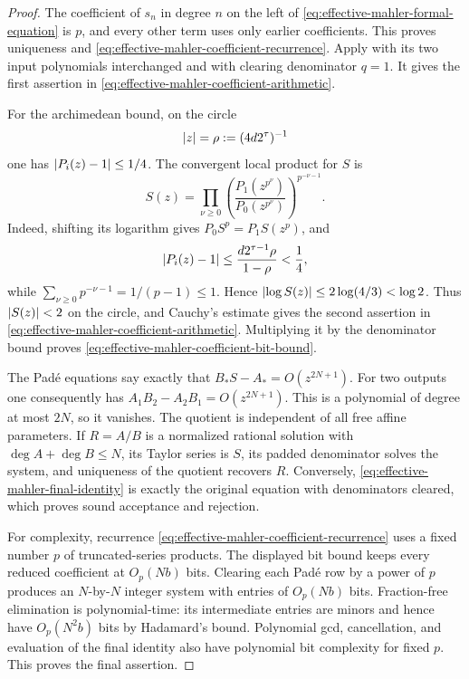 \begin{proof}
The coefficient of \(s_n\) in degree \(n\) on the left of
\eqref{eq:effective-mahler-formal-equation} is \(p\), and every other term
uses only earlier coefficients.  This proves uniqueness and
\eqref{eq:effective-mahler-coefficient-recurrence}.  Apply
 with its two input
polynomials interchanged and with clearing denominator \(q=1\).  It gives
the first assertion in \eqref{eq:effective-mahler-coefficient-arithmetic}.

For the archimedean bound, on the circle
\[
 \lvert z \rvert=\rho:=(4d2^\tau)^{-1}
\]
one has \(\lvert P_i(z)-1 \rvert\le1/4\).  The convergent local product for \(S\)
is
\[
 S(z)=\prod_{\nu\ge0}
 \left(\frac{P_1(z^{p^\nu})}{P_0(z^{p^\nu})}\right)^{p^{-\nu-1}}.
\]
Indeed, shifting its logarithm gives
\(P_0S^p=P_1S(z^p)\), and
\[
 \lvert P_i(z)-1 \rvert
 \le\frac{d2^{\tau-1}\rho}{1-\rho}<\frac14,
\]
while \(\sum_{\nu\ge0}p^{-\nu-1}=1/(p-1)\le1\).  Hence
\(\lvert \log S(z) \rvert\le2\log(4/3)<\log2\).  Thus
\(\lvert S(z) \rvert<2\) on the circle, and Cauchy's estimate gives
the second assertion in \eqref{eq:effective-mahler-coefficient-arithmetic}.
Multiplying it by the denominator bound proves
\eqref{eq:effective-mahler-coefficient-bit-bound}.

The Pad\'e equations say exactly that
\(B_*S-A_*=O(z^{2N+1})\).  For two outputs one consequently has
\(A_1B_2-A_2B_1=O(z^{2N+1})\).  This is a polynomial of degree at most
\(2N\), so it vanishes.  The quotient is independent of all free affine
parameters.  If \(R=A/B\) is a normalized rational solution with
\(\deg A+\deg B\le N\), its Taylor series is \(S\), its padded denominator
solves the system, and uniqueness of the quotient recovers \(R\).  Conversely,
\eqref{eq:effective-mahler-final-identity} is exactly the original equation
with denominators cleared, which proves sound acceptance and rejection.

For complexity, recurrence \eqref{eq:effective-mahler-coefficient-recurrence}
uses a fixed number \(p\) of truncated-series products.  The displayed bit
bound keeps every reduced coefficient at \(O_p(Nb)\) bits.  Clearing each
Pad\'e row by a power of \(p\) produces an \(N\)-by-\(N\) integer system with
entries of \(O_p(Nb)\) bits.  Fraction-free elimination is polynomial-time:
its intermediate entries are minors and hence have \(O_p(N^2b)\) bits by
Hadamard's bound.  Polynomial gcd, cancellation, and evaluation of the final
identity also have polynomial bit complexity for fixed \(p\).  This proves
the final assertion.
\end{proof}

